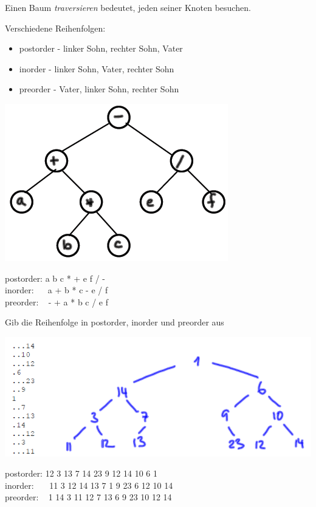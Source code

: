 \documentclass{beamer}
\begin{document}
\begin{frame}[fragile]

Einen Baum \textit{traversieren} bedeutet, jeden seiner Knoten besuchen.  

Verschiedene Reihenfolgen:  

\begin{itemize}
\item postorder - linker Sohn, rechter Sohn, Vater 
\item inorder -  linker Sohn, Vater, rechter Sohn
\item preorder -  Vater, linker Sohn, rechter Sohn 
\end{itemize} 

\begin{minipage}[b]{6cm}
 \includegraphics[scale=0.6]{bild9.png} 
\end{minipage}  \pause
\begin{minipage}[b]{5cm}
postorder: \pause a b c * + e f / - \\ 
inorder: \pause ~~ a + b * c - e / f  \\ 
preorder:  \pause ~ - + a * b c / e f 
\end{minipage} 
\end{frame}

\begin{frame}[fragile]
Gib die Reihenfolge in postorder, inorder und preorder aus

 \includegraphics[scale=0.8]{bild10.png}  

postorder:  12 3 13 7 14 23 9 12 14 10 6 1 \\ 
inorder: \pause ~~~11 3 12 14 13 7 1 9 23 6 12 10 14 \\ 
preorder: \pause ~ 1 14 3 11 12 7 13 6 9 23 10 12 14  


\end{frame}
\end{document}
